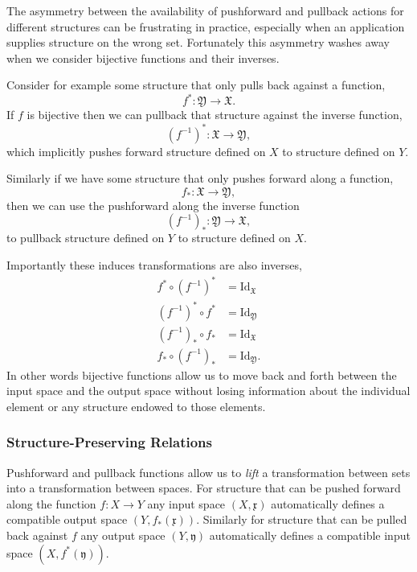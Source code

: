 \documentclass[
  letterpaper,
  DIV=11,
  numbers=noendperiod]{scrartcl}
\begin{document}
The asymmetry between the availability of pushforward and pullback
actions for different structures can be frustrating in practice,
especially when an application supplies structure on the wrong set.
Fortunately this asymmetry washes away when we consider bijective
functions and their inverses.

Consider for example some structure that only pulls back against a
function, \[
f^{*} : \mathfrak{Y} \rightarrow \mathfrak{X}.
\] If \(f\) is bijective then we can pullback that structure against the
inverse function, \[
(f^{-1})^{*} : \mathfrak{X} \rightarrow \mathfrak{Y},
\] which implicitly pushes forward structure defined on \(X\) to
structure defined on \(Y\).

Similarly if we have some structure that only pushes forward along a
function, \[
f_{*} : \mathfrak{X} \rightarrow \mathfrak{Y},
\] then we can use the pushforward along the inverse function \[
(f^{-1})_{*} : \mathfrak{Y} \rightarrow \mathfrak{X},
\] to pullback structure defined on \(Y\) to structure defined on \(X\).

Importantly these induces transformations are also inverses,
\begin{align*}
f^{*} \circ (f^{-1})^{*} &= \mathrm{Id}_{\mathfrak{X}}
\\
(f^{-1})^{*} \circ f^{*} &= \mathrm{Id}_{\mathfrak{Y}}
\\
(f^{-1})_{*} \circ f_{*} &= \mathrm{Id}_{\mathfrak{X}}
\\
f_{*} \circ (f^{-1})_{*} &= \mathrm{Id}_{\mathfrak{Y}}.
\end{align*} In other words bijective functions allow us to move back
and forth between the input space and the output space without losing
information about the individual element or any structure endowed to
those elements.

\hypertarget{structure-preserving-relations}{%
\subsubsection{Structure-Preserving
Relations}\label{structure-preserving-relations}}

Pushforward and pullback functions allow us to \emph{lift} a
transformation between sets into a transformation between spaces. For
structure that can be pushed forward along the function
\(f : X \rightarrow Y\) any input space \((X, \mathfrak{x})\)
automatically defines a compatible output space
\((Y, f_{*}(\mathfrak{x}))\). Similarly for structure that can be pulled
back against \(f\) any output space \((Y, \mathfrak{y})\) automatically
defines a compatible input space \((X, f^{*}(\mathfrak{y}))\).
\end{document}
